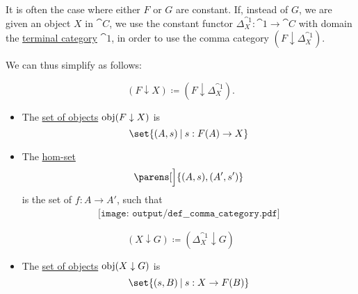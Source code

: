 \begin{definition}
\begin{thmenum}
     It is often the case where either \( F \) or \( G \) are constant. If, instead of \( G \), we are given an object \( X \) in \( \cat{C} \), we use the constant functor \( \Delta_X^{\cat{1}}: \cat{1} \to \cat{C} \) with domain the \hyperref[def:universal_categories]{terminal category} \( \cat{1} \), in order to use the comma category \( (F \downarrow \Delta_X^{\cat{1}}) \).

    We can thus simplify  as follows:

    \begin{minipage}[t]{0.43\textwidth}
      \begin{equation*}
        (F \downarrow X) \coloneqq (F \downarrow \Delta_X^{\cat{1}}).
      \end{equation*}

      \begin{itemize}
        \item The \hyperref[def:category/objects]{set of objects} \( \operatorname{obj}(F \downarrow X) \) is
        \begin{equation*}
          \set{ (A, s) \given s: F(A) \to X }
        \end{equation*}

        \item The \hyperref[def:category/morphisms]{hom-set}
        \begin{equation*}
          [F \downarrow X]\parens[\Big]{ (A, s), (A', s') }
        \end{equation*}
        is the set of \( f: A \to A' \), such that
        \begin{equation}\label{eq:def:comma_category/fixed/right}
          \begin{aligned}
            \texttt{[image: output/def\_\_comma\_category.pdf]}
          \end{aligned}
        \end{equation}
      \end{itemize}
    \end{minipage}
    \begin{minipage}[t]{0.43\textwidth}
      \begin{equation*}
        (X \downarrow G) \coloneqq (\Delta_X^{\cat{1}} \downarrow G)
      \end{equation*}

      \begin{itemize}
        \item The \hyperref[def:category/objects]{set of objects} \( \operatorname{obj}(X \downarrow G) \) is
        \begin{equation*}
          \set{ (s, B) \given s: X \to F(B) }
        \end{equation*}


\end{itemize}
\end{minipage}
\end{thmenum}
\end{definition}
